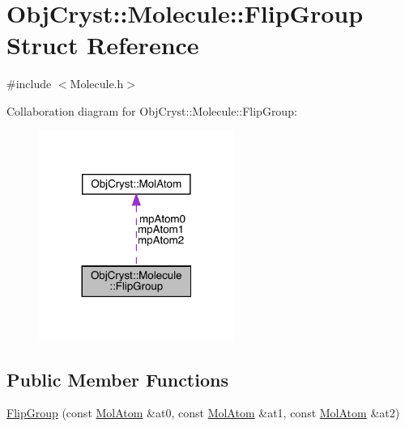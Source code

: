\hypertarget{struct_obj_cryst_1_1_molecule_1_1_flip_group}{}\section{Obj\+Cryst\+::Molecule\+::Flip\+Group Struct Reference}
\label{struct_obj_cryst_1_1_molecule_1_1_flip_group}


{\ttfamily \#include $<$Molecule.\+h$>$}



Collaboration diagram for Obj\+Cryst\+::Molecule\+::Flip\+Group\+:
\nopagebreak
\begin{figure}[H]
\begin{center}
\leavevmode
\includegraphics[width=180pt]{struct_obj_cryst_1_1_molecule_1_1_flip_group__coll__graph}
\end{center}
\end{figure}
\subsection*{Public Member Functions}
\begin{DoxyCompactItemize}
\item 
\mbox{\hyperlink{struct_obj_cryst_1_1_molecule_1_1_flip_group_ac065fb88e47795199d5e0c12dd53b839}{Flip\+Group}} (const \mbox{\hyperlink{class_obj_cryst_1_1_mol_atom}{Mol\+Atom}} \&at0, const \mbox{\hyperlink{class_obj_cryst_1_1_mol_atom}{Mol\+Atom}} \&at1, const \mbox{\hyperlink{class_obj_cryst_1_1_mol_atom}{Mol\+Atom}} \&at2)
\end{DoxyCompactItemize}
